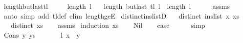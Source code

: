 \begin{isabellebody}
\ length{\isacharunderscore}{\kern0pt}butlast{\isacharunderscore}{\kern0pt}tl{\isacharcolon}{\kern0pt}\isanewline
\ \ \ {\isachardoublequoteopen}{}\ {\isasymle}\ length\ l{\isachardoublequoteclose}\isanewline
\ \ \ {\isachardoublequoteopen}length\ {\isacharparenleft}{\kern0pt}butlast\ {\isacharparenleft}{\kern0pt}tl\ l{\isacharparenright}{\kern0pt}{\isacharparenright}{\kern0pt}\ {\isacharequal}{\kern0pt}\ length\ l\ {\isacharminus}{\kern0pt}\ {}{\isachardoublequoteclose}%
\endisataginvisible
{\isafoldinvisible}%
%
\isadeliminvisible
\isanewline
%
\endisadeliminvisible
%
\isadelimproof
\ \ %
\endisadelimproof
%
\isatagproof
{}\isamarkupfalse%
\ assms\isanewline
\ \ \isamarkupfalse%
\ {\isacharparenleft}{\kern0pt}auto\ simp\ add{\isacharcolon}{\kern0pt}\ tl{\isacharunderscore}{\kern0pt}def\ elim{\isacharcolon}{\kern0pt}\ length{\isacharunderscore}{\kern0pt}ge{\isacharunderscore}{\kern0pt}{}E{\isacharparenright}{\kern0pt}%
\endisatagproof
{\isafoldproof}%
%
\isadelimproof
%
\endisadelimproof
%
\isadeliminvisible
%
\endisadeliminvisible
%
\isataginvisible
%
\isamarkuptrue%
\isamarkupfalse%
\ distinct{\isacharunderscore}{\kern0pt}ins{\isacharunderscore}{\kern0pt}listD{\isacharcolon}{\kern0pt}\isanewline
\ \ \ {\isachardoublequoteopen}distinct\ {\isacharparenleft}{\kern0pt}ins{\isacharunderscore}{\kern0pt}list\ x\ xs{\isacharparenright}{\kern0pt}{\isachardoublequoteclose}\isanewline
\ \ \ {\isachardoublequoteopen}distinct\ xs{\isachardoublequoteclose}%
\endisataginvisible
{\isafoldinvisible}%
%
\isadeliminvisible
\isanewline
%
\endisadeliminvisible
%
\isadelimproof
\ \ %
\endisadelimproof
%
\isatagproof
{}\isamarkupfalse%
\ assms\isanewline
{}\isamarkupfalse%
\ {\isacharparenleft}{\kern0pt}induction\ xs{\isacharparenright}{\kern0pt}\isanewline
\ \ \isamarkupfalse%
\ Nil\isanewline
\ \ \isamarkupfalse%
\ {\isacharquery}{\kern0pt}case\isanewline
\ \ \ \ \isamarkupfalse%
\ simp\isanewline
{}\isamarkupfalse%
\isanewline
\ \ \isamarkupfalse%
\ {\isacharparenleft}{\kern0pt}Cons\ y\ ys{\isacharparenright}{\kern0pt}\isanewline
\ \ \isamarkupfalse%
\isanewline
\ \ \ \ {\isacharparenleft}{\kern0pt}l{\isacharparenright}{\kern0pt}\ {\isachardoublequoteopen}x\ {\isacharless}{\kern0pt}\ y{\isachardoublequoteclose}\ {\isacharbar}{\kern0pt}\isanewline

\end{isabellebody}
